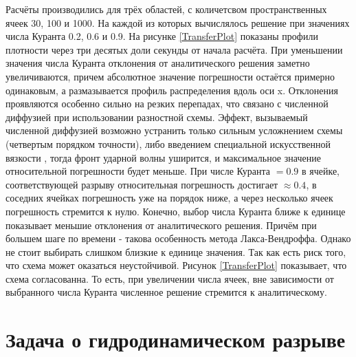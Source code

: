 \documentclass[a4paper]{article}
\begin{document}
	Расчёты производились для трёх областей, с количетсвом пространственных ячеек 30, 100 и 1000. На каждой из которых вычислялось решение при значениях числа Куранта 0.2, 0.6 и 0.9. На рисунке \ref{TransferPlot} показаны профили плотности через три десятых доли секунды от начала расчёта. При уменьшении значения числа Куранта отклонения от аналитического решения заметно увеличиваются, причем абсолютное значение погрешности остаётся примерно одинаковым, а размазывается профиль распределения вдоль оси x.
	Отклонения проявляются особенно сильно на резких перепадах, что связано с численной диффузией при использовании разностной схемы. Эффект, вызываемый численной диффузией возможно устранить только сильным усложнением схемы (четвертым порядком точности), либо введением специальной искусственной вязкости \cite{Richtmayer}, тогда фронт ударной волны уширится, и максимальное значение относительной погрешности будет меньше. 
	При числе Куранта $=0.9$ в ячейке, соответствующей разрыву относительная погрешность достигает $\approx 0.4$, в соседних ячейках погрешность уже на порядок ниже, а через несколько ячеек погрешность стремится к нулю. Конечно, выбор числа Куранта ближе к единице показывает меньшие отклонения от аналитического решения. Причём при большем шаге по времени - такова особенность метода Лакса-Вендроффа. Однако не стоит выбирать слишком близкие к единице значения. Так как есть риск того, что схема может оказаться неустойчивой. 
	Рисунок \ref{TransferPlot} показывает, что схема согласованна. То есть, при увеличении числа ячеек, вне зависимости от выбранного числа Куранта численное решение стремится к аналитическому. 
	

	

	\section{Задача о гидродинамическом разрыве}\label{hydrodynamics}
\end{document}

